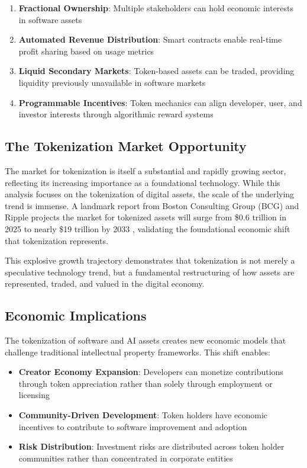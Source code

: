 \documentclass[11pt]{article}
\begin{document}
\begin{enumerate}
\item \textbf{Fractional Ownership}: Multiple stakeholders can hold economic interests in software assets
\item \textbf{Automated Revenue Distribution}: Smart contracts enable real-time profit sharing based on usage metrics
\item \textbf{Liquid Secondary Markets}: Token-based assets can be traded, providing liquidity previously unavailable in software markets
\item \textbf{Programmable Incentives}: Token mechanics can align developer, user, and investor interests through algorithmic reward systems
\end{enumerate}

\subsection{The Tokenization Market Opportunity}

The market for tokenization is itself a substantial and rapidly growing sector, reflecting its increasing importance as a foundational technology. While this analysis focuses on the tokenization of digital assets, the scale of the underlying trend is immense. A landmark report from Boston Consulting Group (BCG) and Ripple projects the market for tokenized assets will surge from \$0.6 trillion in 2025 to nearly \$19 trillion by 2033 \cite{bcg_ripple_tokenization_2024}, validating the foundational economic shift that tokenization represents.

This explosive growth trajectory demonstrates that tokenization is not merely a speculative technology trend, but a fundamental restructuring of how assets are represented, traded, and valued in the digital economy.

\subsection{Economic Implications}

The tokenization of software and AI assets creates new economic models that challenge traditional intellectual property frameworks. This shift enables:

\begin{itemize}
\item \textbf{Creator Economy Expansion}: Developers can monetize contributions through token appreciation rather than solely through employment or licensing
\item \textbf{Community-Driven Development}: Token holders have economic incentives to contribute to software improvement and adoption
\item \textbf{Risk Distribution}: Investment risks are distributed across token holder communities rather than concentrated in corporate entities
\end{itemize}
\end{document}
